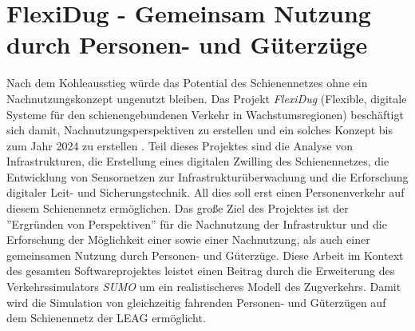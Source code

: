 \section{FlexiDug - Gemeinsam Nutzung durch Personen- und Güterzüge}

Nach dem Kohleausstieg würde das Potential des Schienennetzes ohne ein Nachnutzungskonzept ungenutzt bleiben\cite{rbb_hpi_2022}. Das Projekt \emph{FlexiDug} (Flexible, digitale Systeme für den schienengebundenen Verkehr in Wachstumsregionen) beschäftigt sich damit, Nachnutzungsperspektiven zu erstellen und ein solches Konzept bis zum Jahr 2024 zu erstellen \cite{hasso_plattner_institut_flexidug_2022}. Teil dieses Projektes sind die Analyse von Infrastrukturen, die Erstellung eines digitalen Zwilling des Schienennetzes, die Entwicklung von Sensornetzen zur Infrastrukturüberwachung und die Erforschung digitaler Leit- und Sicherungstechnik. All dies soll erst einen Personenverkehr auf diesem Schienennetz ermöglichen. Das große Ziel des Projektes ist der ''Ergründen von Perspektiven'' für die Nachnutzung der Infrastruktur und die Erforschung der Möglichkeit einer sowie einer Nachnutzung, als auch einer gemeinsamen Nutzung durch Personen- und Güterzüge.\cite{rbb_hpi_2022} Diese Arbeit im Kontext des gesamten Softwareprojektes leistet einen Beitrag durch die Erweiterung des Verkehrssimulators \emph{SUMO} um ein realistischeres Modell des Zugverkehrs. Damit wird die Simulation von gleichzeitig fahrenden Personen- und Güterzügen auf dem Schienennetz der LEAG ermöglicht.
